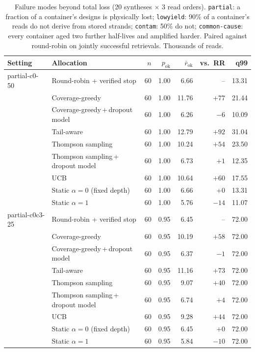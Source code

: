 \begin{table}[!t]
\centering
\caption{Failure modes beyond total loss (20 syntheses $\times$ 3 read orders).  \texttt{partial}: a fraction of a container's designs is physically lost; \texttt{lowyield}: 90\% of a container's reads do not derive from stored strands; \texttt{contam}: 50\% do not; \texttt{common-cause}: every container aged two further half-lives and amplified harder.  Paired against round-robin on jointly successful retrievals.  Thousands of reads.}
\label{tab:r4fail}
\scriptsize
\setlength{\tabcolsep}{3pt}
\begin{tabular}{@{}llrrrrr@{}}
\toprule
Setting & Allocation & $n$ & $p_{\text{ok}}$ & $\bar r_{\text{ok}}$ & vs.\ RR & q99 \\
\midrule
partial-c0-50 & Round-robin + verified stop & 60 & 1.00 & 6.66 & -- & 13.31 \\
 & Coverage-greedy & 60 & 1.00 & 11.76 & $+77$ & 21.44 \\
 & Coverage-greedy\,+\,dropout model & 60 & 1.00 & 6.26 & $-6$ & 10.09 \\
 & Tail-aware & 60 & 1.00 & 12.79 & $+92$ & 31.04 \\
 & Thompson sampling & 60 & 1.00 & 10.24 & $+54$ & 23.50 \\
 & Thompson sampling\,+\,dropout model & 60 & 1.00 & 6.73 & $+1$ & 12.35 \\
 & UCB & 60 & 1.00 & 10.64 & $+60$ & 17.55 \\
 & Static $\alpha{=}0$ (fixed depth) & 60 & 1.00 & 6.66 & $+0$ & 13.31 \\
 & Static $\alpha{=}1$ & 60 & 1.00 & 5.76 & $-14$ & 11.07 \\
\midrule
partial-c0c3-25 & Round-robin + verified stop & 60 & 0.95 & 6.45 & -- & 72.00 \\
 & Coverage-greedy & 60 & 0.95 & 10.19 & $+58$ & 72.00 \\
 & Coverage-greedy\,+\,dropout model & 60 & 0.95 & 6.37 & $-1$ & 72.00 \\
 & Tail-aware & 60 & 0.95 & 11.16 & $+73$ & 72.00 \\
 & Thompson sampling & 60 & 0.95 & 9.07 & $+40$ & 72.00 \\
 & Thompson sampling\,+\,dropout model & 60 & 0.95 & 6.74 & $+4$ & 72.00 \\
 & UCB & 60 & 0.95 & 9.28 & $+44$ & 72.00 \\
 & Static $\alpha{=}0$ (fixed depth) & 60 & 0.95 & 6.45 & $+0$ & 72.00 \\
 & Static $\alpha{=}1$ & 60 & 0.95 & 5.84 & $-10$ & 72.00 \\

\end{tabular}
\end{table}
